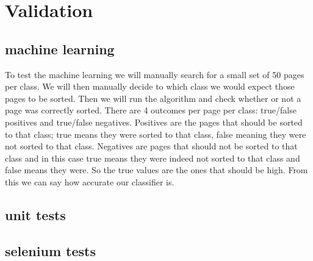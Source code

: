 \chapter{Validation}

\section {machine learning}
To test the machine learning we will manually search for a small set of 50 pages per class. We will then manually decide to which class we would expect those pages to be sorted. Then we will run the algorithm and check whether or not a page was correctly sorted. There are 4 outcomes per page per class: true/false positives and true/false negatives. Positives are the pages that should be sorted to that class; true means they were sorted to that class, false meaning they were not sorted to that class. Negatives are pages that should not be sorted to that class and in this case true means they were indeed not sorted to that class and false means they were. So the true values are the ones that should be high. From this we can say how accurate our classifier is.

\section{unit tests}

\section{selenium tests}

